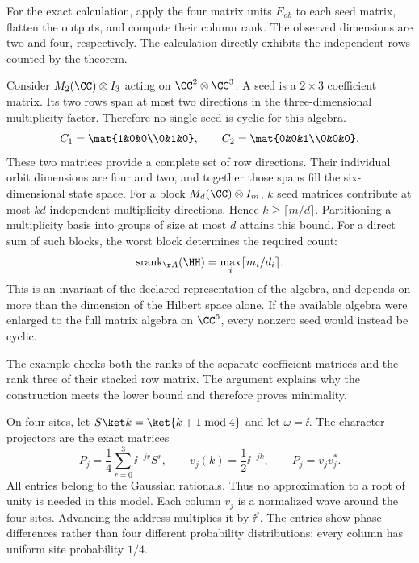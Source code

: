 For the exact calculation, apply the four matrix units $E_{ab}$ to each seed matrix, flatten the outputs, and compute their column rank. The observed dimensions are two and four, respectively. The calculation directly exhibits the independent rows counted by the theorem.

Consider $M_2(\CC)\otimes I_3$ acting on $\CC^2\otimes\CC^3$. A seed is a $2\times3$ coefficient matrix. Its two rows span at most two directions in the three-dimensional multiplicity factor. Therefore no single seed is cyclic for this algebra.
\[
C_1=\mat{1&0&0\\0&1&0},\qquad
C_2=\mat{0&0&1\\0&0&0}.
\]
These two matrices provide a complete set of row directions. Their individual orbit dimensions are four and two, and together those spans fill the six-dimensional state space.
For a block $M_d(\CC)\otimes I_m$, $k$ seed matrices contribute at most $kd$ independent multiplicity directions. Hence $k\ge\lceil m/d\rceil$. Partitioning a multiplicity basis into groups of size at most $d$ attains this bound. For a direct sum of such blocks, the worst block determines the required count:
\[
\operatorname{srank}_{\AA}(\HH)=\max_i\lceil m_i/d_i\rceil.
\]
This is an invariant of the declared representation of the algebra, and depends on more than the dimension of the Hilbert space alone. If the available algebra were enlarged to the full matrix algebra on $\CC^6$, every nonzero seed would instead be cyclic.

The example checks both the ranks of the separate coefficient matrices and the rank three of their stacked row matrix. The argument explains why the construction meets the lower bound and therefore proves minimality.

On four sites, let $S\ket k=\ket{k+1\bmod4}$ and let $\omega=\ii$. The character projectors are the exact matrices
\[
P_j=\frac14\sum_{r=0}^3\ii^{-jr}S^r,
\qquad v_j(k)=\frac12\ii^{-jk},\qquad P_j=v_jv_j^*.
\]
All entries belong to the Gaussian rationals. Thus no approximation to a root of unity is needed in this model.
Each column $v_j$ is a normalized wave around the four sites. Advancing the address multiplies it by $\ii^j$. The entries show phase differences rather than four different probability distributions: every column has uniform site probability $1/4$.

